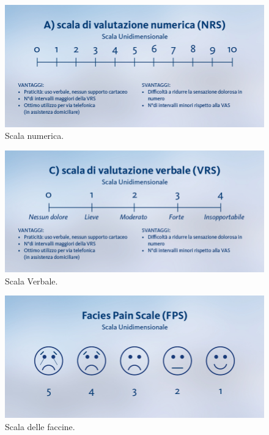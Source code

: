 \begin{figure}[H]
    \begin{center}
    \includegraphics[width=0.6\columnwidth]{img/NUMERICA.jpeg}
    \vspace{-3mm}
    \end{center}
    \caption{Scala numerica.
    \cite{SCALEDOLORE}}
    \label{fig:FIGURE_5.10}
\end{figure}

\begin{figure}[H]
    \begin{center}
    \includegraphics[width=0.6\columnwidth]{img/VERBALE.jpeg}
    \vspace{-3mm}
    \end{center}
    \caption{Scala Verbale.
    \cite{SCALEDOLORE}}
    \label{fig:FIGURE_5.11}
\end{figure}

\begin{figure}[H]
    \begin{center}
    \includegraphics[width=0.6\columnwidth]{img/FACCINE.jpeg}
    \vspace{-3mm}
    \end{center}
    \caption{Scala delle faccine.
    \cite{SCALEDOLORE}}
    \label{fig:FIGURE_5.12}
\end{figure}

